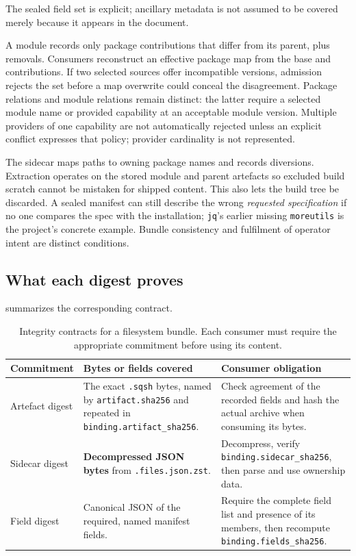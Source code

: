 The sealed field set is explicit; ancillary metadata is not assumed to be covered merely because it appears in the document.

A module records only package contributions that differ from its parent, plus removals. Consumers reconstruct an effective package map from the base and contributions. If two selected sources offer incompatible versions, admission rejects the set before a map overwrite could conceal the disagreement. Package relations and module relations remain distinct: the latter require a selected module name or provided capability at an acceptable module version. Multiple providers of one capability are not automatically rejected unless an explicit conflict expresses that policy; provider cardinality is not represented.

The sidecar maps paths to owning package names and records diversions. Extraction operates on the stored module and parent artefacts so excluded build scratch cannot be mistaken for shipped content. This also lets the build tree be discarded. A sealed manifest can still describe the wrong \emph{requested specification} if no one compares the spec with the installation; \texttt{jq}'s earlier missing \texttt{moreutils} is the project's concrete example. Bundle consistency and fulfilment of operator intent are distinct conditions.

\subsection{What each digest proves}
\label{sec:arch:digests}

 summarizes the corresponding contract.
\begin{table}[tbp]
\centering\small
\begin{tabularx}{\textwidth}{@{}p{2.6cm}YY@{}}
\toprule
Commitment & Bytes or fields covered & Consumer obligation \\
\midrule
Artefact digest & The exact \texttt{.sqsh} bytes, named by \texttt{artifact.sha256} and repeated in \texttt{binding.artifact\_sha256}. & Check agreement of the recorded fields and hash the actual archive when consuming its bytes. \\
Sidecar digest & \textbf{Decompressed \ac{JSON} bytes} from \texttt{.files.json.zst}. & Decompress, verify \texttt{binding.sidecar\_sha256}, then parse and use ownership data. \\
Field digest & Canonical \ac{JSON} of the required, named manifest fields. & Require the complete field list and presence of its members, then recompute \texttt{binding.fields\_sha256}. \\
\bottomrule
\end{tabularx}
\caption{Integrity contracts for a filesystem bundle. Each consumer must require the appropriate commitment before using its content.}
\label{tab:digests}
\end{table}


